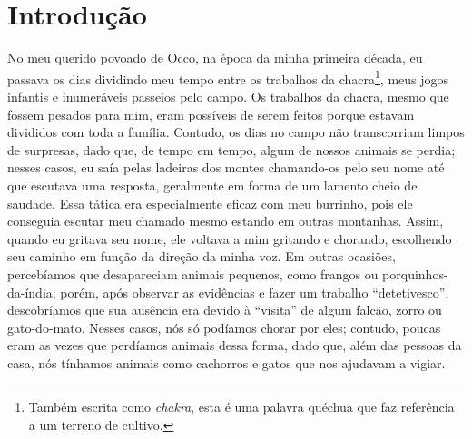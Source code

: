 \cleardoublepage
\newpage
\ifdefined\EnableIncludeImages
\fi
\chapter*{Introdução} %

No meu querido povoado de Occo, na época da minha primeira década, eu passava os dias dividindo meu tempo entre os trabalhos da chacra\footnote{Também escrita como \textit{chakra}, esta é uma palavra quéchua que faz referência a um terreno de cultivo.}, meus jogos infantis e inumeráveis passeios pelo campo.
Os trabalhos da chacra, mesmo que fossem pesados para mim, eram possíveis de serem feitos porque estavam divididos com toda a família.
Contudo, os dias no campo não transcorriam limpos de surpresas, dado que, de tempo em tempo, algum de nossos animais se perdia; nesses casos, eu saía pelas ladeiras dos montes chamando-os pelo seu nome até que escutava uma resposta, geralmente em forma de um lamento cheio de saudade.
Essa tática era especialmente eficaz com meu burrinho, pois ele conseguia escutar meu chamado mesmo estando em outras montanhas. Assim, quando eu gritava seu nome, ele voltava a mim gritando e chorando, escolhendo seu caminho em função da direção da minha voz.
Em outras ocasiões, percebíamos que desapareciam animais pequenos, como frangos ou porquinhos-da-índia; porém, após observar as evidências e fazer um trabalho ``detetivesco'', descobríamos que sua ausência era devido à ``visita'' de algum falcão, zorro ou gato-do-mato.
Nesses casos, nós só podíamos chorar por eles; contudo, poucas eram as vezes que perdíamos animais dessa forma, dado que, além das pessoas da casa, nós tínhamos animais como cachorros e gatos que nos ajudavam a vigiar.

